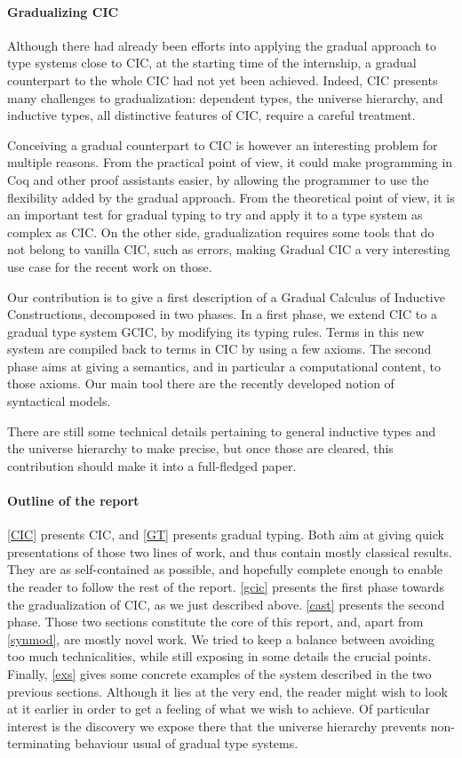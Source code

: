 \documentclass[en]{myarticle}
\DeclareMathOperator{\?}{?}
\newcommand{\gcic}{GCIC}
\begin{document}
{\paragraph{Gradualizing CIC}
Although there had already been efforts into applying the gradual approach to type systems close to CIC, at the starting time of the internship, a gradual counterpart to the whole CIC had not yet been achieved. Indeed, CIC presents many challenges to gradualization: dependent types, the universe hierarchy, and inductive types, all distinctive features of CIC, require a careful treatment.

Conceiving a gradual counterpart to CIC is however an interesting problem for multiple reasons. From the practical point of view, it could make programming in Coq and other proof assistants easier, by allowing the programmer to use the flexibility added by the gradual approach. From the theoretical point of view, it is an important test for gradual typing to try and apply it to a type system as complex as CIC. On the other side, gradualization requires some tools that do not belong to vanilla CIC, such as errors, making Gradual CIC a very interesting use case for the recent work on those.

Our contribution is to give a first description of a Gradual Calculus of Inductive Constructions, decomposed in two phases. In a first phase, we extend CIC to a gradual type system \gcic, by modifying its typing rules. Terms in this new system are compiled back to terms in CIC by using a few axioms. The second phase aims at giving a semantics, and in particular a computational content, to those axioms. Our main tool there are the recently developed notion of syntactical models.

There are still some technical details pertaining to general inductive types and the universe hierarchy to make precise, but once those are cleared, this contribution should make it into a full-fledged paper.

\paragraph{Outline of the report}
\autoref{CIC} presents CIC, and \autoref{GT} presents gradual typing. Both aim at giving quick presentations of those two lines of work, and thus contain mostly classical results. They are as self-contained as possible, and hopefully complete enough to enable the reader to follow the rest of the report. \autoref{gcic} presents the first phase towards the gradualization of CIC, as we just described above. \autoref{cast} presents the second phase. Those two sections constitute the core of this report, and, apart from \autoref{synmod}, are mostly novel work. We tried to keep a balance between avoiding too much technicalities, while still exposing in some details the crucial points. Finally, \autoref{exs} gives some concrete examples of the system described in the two previous sections. Although it lies at the very end, the reader might wish to look at it earlier in order to get a feeling of what we wish to achieve. Of particular interest is the discovery we expose there that the universe hierarchy prevents non-terminating behaviour usual of gradual type systems.


}
\end{document}

